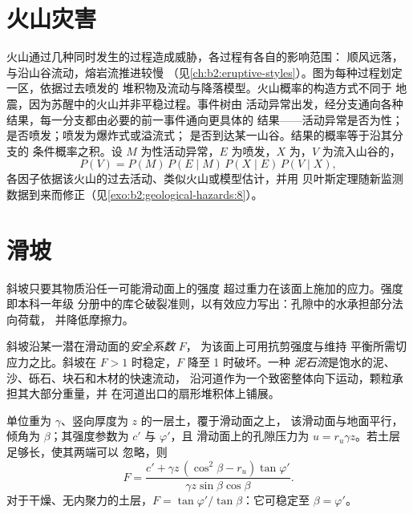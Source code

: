 \section{火山灾害}\label{sec:b2:geological-hazards:volcanic}

火山通过几种同时发生的过程造成威胁，各过程有各自的影响范围：
顺风远落，与沿山谷流动，熔岩流推进较慢
（见\cref{ch:b2:eruptive-styles}）。图为每种过程划定一区，依据过去喷发的
堆积物及流动与降落模型。火山概率的构造方式不同于
地震，因为苏醒中的火山并非平稳过程。事件树由
活动异常出发，经分支通向各种结果，每一分支都由必要的前一事件通向更具体的
结果——活动异常是否为性；是否喷发；喷发为爆炸式或溢流式；
是否到达某一山谷。结果的概率等于沿其分支的
条件概率之积。设 $M$ 为性活动异常，$E$ 为喷发，$X$ 为，$V$ 为流入山谷的，
\begin{equation*}
P(V) = P(M) \, P(E \mid M) \, P(X \mid E) \, P(V \mid X),
\end{equation*}
各因子依据该火山的过去活动、类似火山或模型估计，并用
贝叶斯定理随新监测数据到来而修正（见\cref{exo:b2:geological-hazards:8}）。

\section{滑坡}\label{sec:b2:geological-hazards:landslides}

斜坡只要其物质沿任一可能滑动面上的强度
超过重力在该面上施加的应力。强度即本科一年级
分册中的库仑破裂准则，以有效应力写出：孔隙中的水承担部分法向荷载，
并降低摩擦力。

\begin{definition}\label{def:b2:geological-hazards:slope}
斜坡沿某一潜在滑动面的\emph{安全系数} $F$，
为该面上可用抗剪强度与维持
平衡所需切应力之比。斜坡在 $F > 1$ 时稳定，$F$ 降至 1 时破坏。一种
\emph{泥石流}是饱水的泥、沙、砾石、块石和木材的快速流动，
沿河道作为一个致密整体向下运动，颗粒承担其大部分重量，并
在河道出口的扇形堆积体上铺展。
\end{definition}

\begin{proposition}[无限边坡]\label{prop:b2:geological-hazards:infinite-slope}
单位重为 $\gamma$、竖向厚度为 $z$ 的一层土，覆于滑动面之上，
该滑动面与地面平行，倾角为 $\beta$；其强度参数为 $c'$ 与 $\varphi'$，且
滑动面上的孔隙压力为 $u = r_u \gamma z$。若土层足够长，使其两端可以
忽略，则
\begin{equation}
F = \frac{c' + \gamma z\,(\cos^2\beta - r_u)\tan\varphi'}{\gamma z \sin\beta\cos\beta}.
\label{eq:b2:geological-hazards:infinite-slope}
\end{equation}
对于干燥、无内聚力的土层，$F = \tan\varphi'/\tan\beta$：它可稳定至 $\beta = \varphi'$。
\end{proposition}

